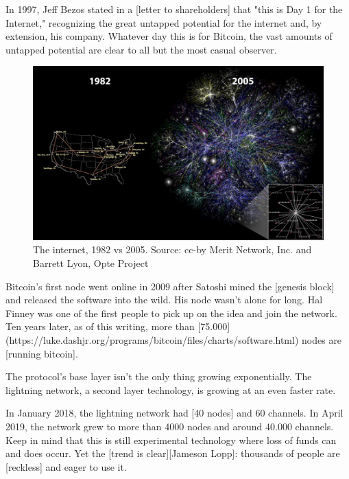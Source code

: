 In 1997, Jeff Bezos stated in a [letter to shareholders] that "this is
Day 1 for the Internet," recognizing the great untapped potential for
the internet and, by extension, his company. Whatever day this is for
Bitcoin, the vast amounts of untapped potential are clear to all but the
most casual observer.

\begin{figure}
  \includegraphics{assets/images/internet-evolution-black-dates.png}
  \caption{The internet, 1982 vs 2005. Source: cc-by Merit Network, Inc. and Barrett Lyon, Opte Project}
  \label{fig:internet-evolution-black-dates}
\end{figure}

Bitcoin's first node went online in 2009 after Satoshi mined the
[genesis block] and released the software into the wild. His node wasn't
alone for long. Hal Finney was one of the first people to pick up on the
idea and join the network. Ten years later, as of this writing, more
than
[75.000](https://luke.dashjr.org/programs/bitcoin/files/charts/software.html)
nodes are [running bitcoin].

The protocol's base layer isn't the only thing growing exponentially.
The lightning network, a second layer technology, is growing at an even
faster rate.

In January 2018, the lightning network had [40 nodes] and 60 channels.
In April 2019, the network grew to more than 4000 nodes and around
40.000 channels. Keep in mind that this is still experimental technology
where loss of funds can and does occur. Yet the [trend is clear][Jameson Lopp]:
thousands of people are [reckless] and eager to use it.

